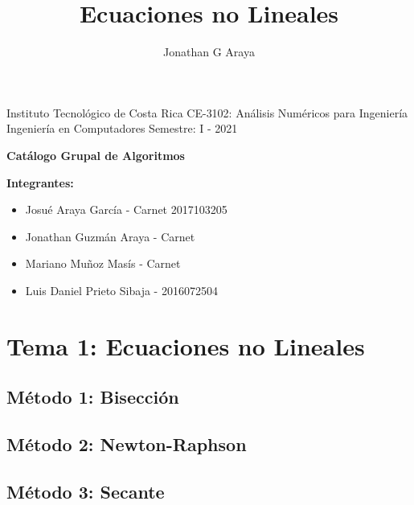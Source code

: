 \documentclass[10pt,a4paper]{article}
\author{Jonathan G Araya}
\title{Ecuaciones no Lineales}
\begin{document}
	Instituto Tecnológico de Costa Rica \hfill CE-3102: Análisis Numéricos para Ingeniería\\
	Ingeniería en Computadores \hfill Semestre: I - 2021\\
	
	\begin{center}
		\textbf{\huge Catálogo Grupal de Algoritmos}
	\end{center}
	
	{\bf Integrantes: }
	\begin{itemize}
		\item Josué Araya García - Carnet 2017103205
		\item Jonathan Guzmán Araya - Carnet
		\item Mariano Muñoz Masís - Carnet
		\item Luis Daniel Prieto Sibaja - 2016072504
	\end{itemize}

	\tableofcontents
	
	\section{Tema 1: Ecuaciones no Lineales}
	
		\subsection{Método 1: Bisección}
	
		
	
		\subsection{Método 2: Newton-Raphson}
		
		
	
		\subsection{Método 3: Secante}
	
		
		
\end{document}
